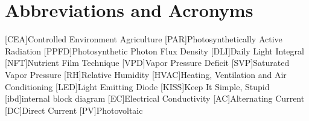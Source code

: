 \chapter{Abbreviations and Acronyms}
%
%
\begin{acronym}%
	[CEA]{Controlled Environment Agriculture}
	[PAR]{Photosynthetically Active Radiation}
	[PPFD]{Photosynthetic Photon Flux Density}
	[DLI]{Daily Light Integral}
	[NFT]{Nutrient Film Technique}
	[VPD]{Vapor Pressure Deficit}
	[SVP]{Saturated Vapor Pressure}
	[RH]{Relative Humidity}
	[HVAC]{Heating, Ventilation and Air Conditioning}
	[LED]{Light Emitting Diode}
	[KISS]{Keep It Simple, Stupid}
	[ibd]{internal block diagram}
	[EC]{Electrical Conductivity}
	[AC]{Alternating Current}
	[DC]{Direct Current}
	[PV]{Photovoltaic}
\end{acronym}
